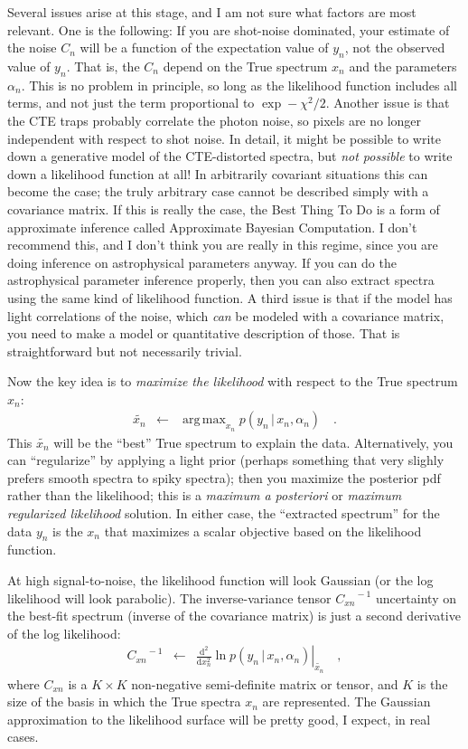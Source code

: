 \documentclass[11pt]{article}
\newcommand{\given}{\,|\,}
\newcommand{\dd}{\mathrm{d}}
\newcommand{\inverse}[1]{{#1}^{\!-1}}
\newcommand{\best}[1]{\widetilde{#1}}
\DeclareMathOperator*{\argmax}{arg\,max}
\begin{document}
Several issues arise at this stage, and I am not sure what factors are
most relevant.
One is the following: If you are shot-noise dominated, your estimate
of the noise $C_n$ will be a function of the expectation value of
$y_n$, not the observed value of $y_n$.
That is, the $C_n$ depend on the True spectrum $x_n$ and the
parameters $\alpha_n$.
This is no problem in principle, so long as the likelihood function
includes all terms, and not just the term proportional to $\exp
-\chi^2/2$.
Another issue is that the CTE traps probably correlate the photon
noise, so pixels are no longer independent with respect to shot noise.
In detail, it might be possible to write down a generative model of
the CTE-distorted spectra, but \emph{not possible} to write down a
likelihood function at all!
In arbitrarily covariant situations this can become the case; the
truly arbitrary case cannot be described simply with a covariance
matrix.
If this is really the case, the Best Thing To Do is a form of
approximate inference called Approximate Bayesian Computation.
I don't recommend this, and I don't think you are really in this
regime, since you are doing inference on astrophysical parameters
anyway.
If you can do the astrophysical parameter inference properly, then you
can also extract spectra using the same kind of likelihood function.
A third issue is that if the model has light correlations of the
noise, which \emph{can} be modeled with a covariance matrix, you need
to make a model or quantitative description of those.
That is straightforward but not necessarily trivial.

Now the key idea is to \emph{maximize the likelihood} with respect to
the True spectrum $x_n$:
\begin{eqnarray}
\best{x_n} &\leftarrow& \argmax_{x_n} p(y_n\given x_n, \alpha_n)
\quad .
\end{eqnarray}
This $\best{x_n}$ will be the ``best'' True spectrum to explain the
data.
Alternatively, you can ``regularize'' by applying a light prior
(perhaps something that very slighly prefers smooth spectra to spiky
spectra); then you maximize the posterior pdf rather than the
likelihood; this is a \emph{maximum a posteriori} or \emph{maximum
  regularized likelihood} solution.
In either case, the ``extracted spectrum'' for the data $y_n$ is the
$x_n$ that maximizes a scalar objective based on the likelihood
function.

At high signal-to-noise, the likelihood function will look Gaussian
(or the log likelihood will look parabolic).
The inverse-variance tensor $\inverse{C_{xn}}$ uncertainty on the
best-fit spectrum (inverse of the covariance matrix) is just a second
derivative of the log likelihood:
\begin{eqnarray}
\inverse{C_{xn}} &\leftarrow&
\left.\frac{\dd^2}{\dd x_n^2}\ln p(y_n\given x_n, \alpha_n)\right|_{\best{x_n}}
\quad ,
\end{eqnarray}
where $C_{xn}$ is a $K\times K$ non-negative semi-definite matrix or
tensor, and $K$ is the size of the basis in which the True spectra
$x_n$ are represented.
The Gaussian approximation to the likelihood surface will be pretty
good, I expect, in real cases.
\end{document}
